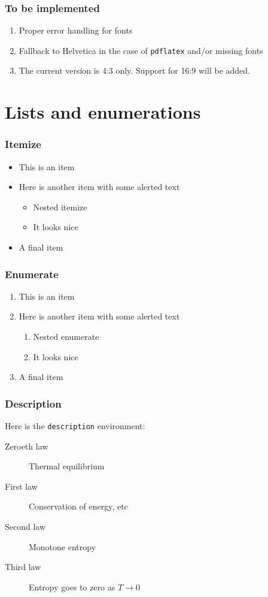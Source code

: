 \documentclass[8pt]{beamer} %
\begin{document}
\begin{frame}
\frametitle{To be implemented}
\begin{enumerate}
\item
  Proper error handling for fonts
\item
  Fallback to Helvetica in the case of \texttt{pdflatex} and/or missing fonts
\item
  The current version is 4:3 only. Support for 16:9 will be added.
\end{enumerate}
\end{frame}

\section{Lists and enumerations}

\begin{frame}
  \frametitle{Itemize}
  \begin{itemize}
    \item This is an item
    \item Here is another item with some \alert{alerted text}
    \begin{itemize}
    \item Nested itemize
    \item It looks nice
    \end{itemize}
    \item A final item
  \end{itemize}
\end{frame}

\begin{frame}
  \frametitle{Enumerate}
  \begin{enumerate}
    \item This is an item
    \item Here is another item with some \alert{alerted text}
    \begin{enumerate}
    \item Nested enumerate
    \item It looks nice
    \end{enumerate}
    \item A final item
  \end{enumerate}
\end{frame}


\begin{frame}
  \frametitle{Description}
  Here is the \alert{\texttt{description}} environment:
  \begin{description}
    \item[Zeroeth law] Thermal equilibrium
    \item[First law] Conservation of energy, etc
    \item[Second law] Monotone entropy
    \item[Third law] Entropy goes to zero as $T\to 0$
  \end{description}
\end{frame}
\end{document}
